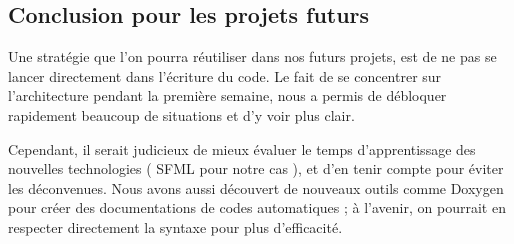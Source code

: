 \documentclass[a4paper,oneside]{article}
\begin{document}
\subsection{Conclusion pour les projets futurs}

Une stratégie que l'on pourra réutiliser dans nos futurs projets, est de ne pas se lancer directement dans l'écriture du code. 
Le fait de se concentrer sur l'architecture pendant la première semaine, nous a permis de débloquer rapidement beaucoup de situations et d'y voir plus clair.


Cependant, il serait judicieux de mieux évaluer le temps d'apprentissage des nouvelles technologies ( SFML pour notre cas ), et d'en tenir compte pour éviter les déconvenues.
Nous avons aussi découvert de nouveaux outils comme Doxygen pour créer des documentations de codes automatiques ;
à l'avenir, on pourrait en respecter directement la syntaxe pour plus d’efficacité. 



\label{myLastPage}
\end{document}
